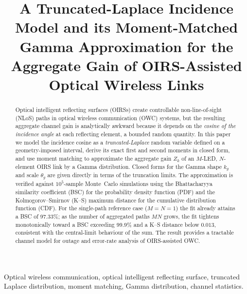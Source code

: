 \documentclass[conference]{IEEEtran}
\begin{document}
\title{A Truncated-Laplace Incidence Model and its Moment-Matched Gamma
Approximation for the Aggregate Gain of OIRS-Assisted Optical Wireless Links}

\author{
}

\maketitle

\begin{abstract}
Optical intelligent reflecting surfaces (OIRSs) create controllable
non-line-of-sight (NLoS) paths in optical wireless communication (OWC)
systems, but the resulting aggregate channel gain is analytically awkward
because it depends on the \emph{cosine of the incidence angle} at each
reflecting element, a bounded random quantity. In this paper we model the
incidence cosine as a \emph{truncated-Laplace} random variable defined on a
geometry-imposed interval, derive its exact first and second moments in
closed form, and use moment matching to approximate the aggregate gain
$Z_k$ of an $M$-LED, $N$-element OIRS link by a Gamma distribution. Closed
forms for the Gamma shape $k_g$ and scale $\theta_g$ are given directly in
terms of the truncation limits. The approximation is verified against
$10^{5}$-sample Monte~Carlo simulations using the Bhattacharyya similarity
coefficient (BSC) for the probability density function (PDF) and the
Kolmogorov--Smirnov (K--S) maximum distance for the cumulative distribution
function (CDF). For the single-path reference case ($M{=}N{=}1$) the fit
already attains a BSC of 97.33\%; as the number of aggregated
paths $MN$ grows, the fit tightens monotonically toward a BSC exceeding
99.9\% and a K--S distance below $0.013$, consistent with the
central-limit behaviour of the sum. The result provides a tractable channel
model for outage and error-rate analysis of OIRS-assisted OWC.
\end{abstract}

\begin{IEEEkeywords}
Optical wireless communication, optical intelligent reflecting surface,
truncated Laplace distribution, moment matching, Gamma distribution,
channel statistics.
\end{IEEEkeywords}
\end{document}
